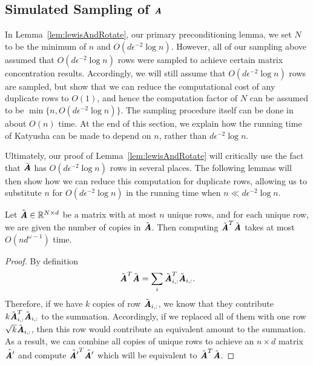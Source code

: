 \subsection{Simulated Sampling of $\AA$}\label{subsec:simulatedSplitting}

In Lemma~\ref{lem:lewisAndRotate}, our primary preconditioning lemma, we set $N$ to be the minimum of $n$ and $O(d\epsilon^{-2}\log{n})$.
However, all of our sampling above assumed that $O(d\epsilon^{-2}\log{n})$ rows were sampled to achieve certain matrix concentration results.
Accordingly, we will still assume that $O(d\epsilon^{-2}\log{n})$ rows are sampled, but show that we can reduce the computational cost of any duplicate rows to $O(1)$, and hence the computation factor of $N$ can be assumed to be $\min\{n,O(d\epsilon^{-2}\log{n})\}$. The sampling procedure itself can be done in about $O(n)$ time. At the end of this section, we explain how the running time of Katyusha can be made to depend on $n$, rather than $d\epsilon^{-2}\log n$.

Ultimately, our proof of Lemma~\ref{lem:lewisAndRotate} will critically use the fact that $\tilde{\AA}$ has $O(d\epsilon^{-2}\log{n})$ rows in several places.
The following lemmas will then show how we can reduce this computation for duplicate rows, allowing us to substitute $n$ for $O(d\epsilon^{-2}\log{n})$ in the running time when $n \ll d\epsilon^{-2}\log{n}$.

\begin{lemma}\label{lem:duplicateRowsForAtransposeA}
	Let $\tilde{\AA} \in \R^{N \times d}$ be a matrix with at most $n$ unique rows, and for each unique row, we are given the number of copies in $\tilde{\AA}$. Then computing $\tilde{\AA}^T\tilde{\AA}$ takes at most $O(nd^{\omega -1})$ time.
\end{lemma}

\begin{proof}
	By definition 
	\[
	\tilde{\AA}^T\tilde{\AA} = \sum_i \tilde{\AA}_{i,:}^T\tilde{\AA}_{i,:}.
	\]
	Therefore, if we have $k$ copies of row $\tilde{\AA}_{i,:}$, we know that they contribute $k\tilde{\AA}_{i,:}^T\tilde{\AA}_{i,:}$ to the summation. Accordingly, if we replaced all of them with one row $\sqrt{k}\tilde{\AA}_{i,:}$, then this row would contribute an equivalent amount to the summation. As a result, we can combine all copies of unique rows to achieve an $n \times d$ matrix $\tilde{\AA'}$ and compute $\tilde{\AA'}^T\tilde{\AA'}$ which will be equivalent to $\tilde{\AA}^T\tilde{\AA}$.
\end{proof}

